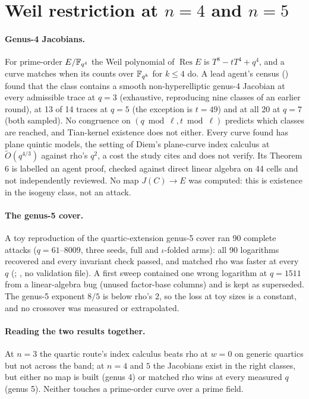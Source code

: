\section{Weil restriction at $n=4$ and $n=5$}\label{sec:jac-weilres}

\paragraph{Genus-4 Jacobians.} For prime-order $E/\mathbb{F}_{q^4}$ the Weil
polynomial of $\operatorname{Res}E$ is $T^8-tT^4+q^4$, and a curve matches
when its counts over $\mathbb{F}_{q^k}$ for $k\le4$ do. A lead agent's census
() found that the class
contains a smooth non-hyperelliptic genus-4 Jacobian at every admissible
trace at $q=3$ (exhaustive, reproducing nine classes of an earlier round),
at 13 of 14 traces at $q=5$ (the exception is $t=49$) and at all 20 at $q=7$
(both sampled). No congruence on $(q\bmod\ell,t\bmod\ell)$ predicts which
classes are reached, and Tian-kernel existence does not either. Every curve
found has plane quintic models, the setting of Diem's plane-curve index
calculus at $\tilde O(q^{4/3})$ against rho's $q^2$, a cost the study cites
and does not verify. Its Theorem 6 is labelled an agent proof, checked
against direct linear algebra on 44 cells and not independently reviewed.
No map $J(C)\to E$ was computed: this is existence in the isogeny class, not
an attack.

\paragraph{The genus-5 cover.} A toy reproduction of the quartic-extension
genus-5 cover ran 90 complete attacks ($q=61$--$8009$, three seeds, full and
$\iota$-folded arms): all 90 logarithms recovered and every invariant
check passed, and matched rho was faster at every $q$
(;
, no validation file). A
first sweep contained one wrong logarithm at $q=1511$ from a linear-algebra
bug (unused factor-base columns) and is kept as superseded. The genus-5
exponent $8/5$ is below rho's $2$, so the loss at toy sizes is a constant,
and no crossover was measured or extrapolated.

\paragraph{Reading the two results together.} At $n=3$ the quartic route's
index calculus beats rho at $w=0$ on generic quartics but not across the
band; at $n=4$ and $5$ the Jacobians exist in the right classes, but either
no map is built (genus 4) or matched rho wins at every measured $q$
(genus 5). Neither touches a prime-order curve over a prime field.

